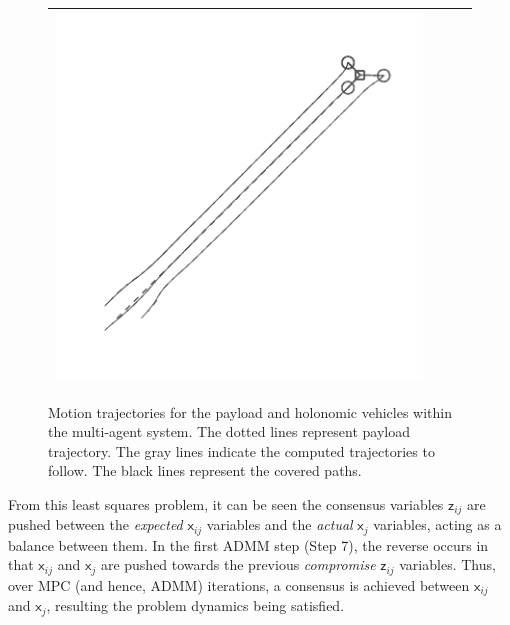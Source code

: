 \documentclass[letterpaper, 10 pt, conference]{ieeeconf}
\newcommand{\cx}{\textsf{x}}
\newcommand{\cz}{\textsf{z}}
\begin{document}
\begin{figure}[t]
\begin{tabular}[t]{|c|c|c|c|}
			\includegraphics[scale=0.65]{figures/holonomic_3_tikz_gray.pdf} \\
		\hline
	\end{tabular}
	\caption{Motion trajectories for the payload and holonomic vehicles within the multi-agent system. The dotted lines represent payload trajectory. The gray lines indicate the computed trajectories to follow. The black lines represent the covered paths.}
	\label{trajectories}
\end{figure}
From this least squares problem, it can be seen the consensus variables $\cz_{ij}$ are pushed between the \textit{expected} $\cx_{ij}$ variables and the \textit{actual} $\cx_j$ variables, acting as a balance between them. In the first ADMM step (Step 7), the reverse occurs in that $\cx_{ij}$ and $\cx_j$ are pushed towards the previous \textit{compromise} $\cz_{ij}$ variables. Thus, over MPC (and hence, ADMM) iterations, a consensus is achieved between $\cx_{ij}$ and $\cx_j$, resulting the problem dynamics being satisfied.
\end{document}

